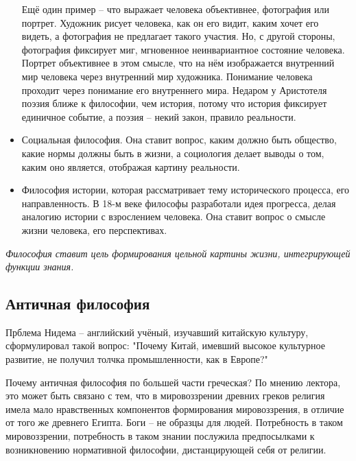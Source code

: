 \documentclass[a4paper, 12pt]{book} %
\begin{document}
\begin{itemize}
Ещё один пример -- что выражает человека объективнее, фотография или портрет. Художник рисует человека, как он его видит, каким хочет его видеть, а фотография не предлагает такого участия. Но, с другой стороны, фотография фиксирует миг, мгновенное неинвариантное состояние человека. Портрет объективнее в этом смысле, что на нём изображается внутренний мир человека через внутренний мир художника. Понимание человека проходит через понимание его внутреннего мира. Недаром у Аристотеля поэзия ближе к философии, чем история, потому что история фиксирует единичное событие, а поэзия -- некий закон, правило реальности.

\item Социальная философия. Она ставит вопрос, каким должно быть общество, какие нормы должны быть в жизни, а социология делает выводы о том, каким оно является, отображая картину реальности. 

\item Философия истории, которая рассматривает тему исторического процесса, его направленность. В 18-м веке философы разработали идея прогресса, делая аналогию истории с взрослением человека. Она ставит вопрос о смысле жизни человека, его перспективах.
 	 
\end{itemize}
\textit{Философия ставит цель формирования цельной картины жизни, интегрирующей функции знания.}

\subsection{Античная философия}

Прблема Нидема -- английский учёный, изучавший китайскую культуру, сформулировал такой вопрос: "Почему Китай, имевший высокое культурное развитие, не получил толчка промышленности, как в Европе?" 

Почему античная философия по большей части греческая? По мнению лектора, это может быть связано с тем, что в мировоззрении древних греков религия имела мало нравственных компонентов формирования мировоззрения, в отличие от того же древнего Египта. Боги -- не образцы для людей. Потребность в таком мировоззрении, потребность в таком знании послужила предпосылками к возникновению нормативной философии, дистанцирующей себя от религии.
\end{document}
